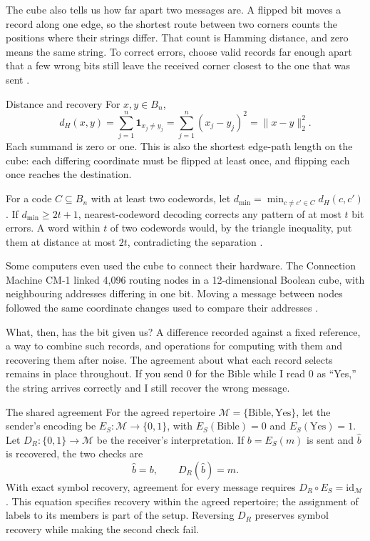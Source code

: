 \documentclass[11pt,a4paper]{article}
\theoremstyle{definition}
\begin{document}
The cube also tells us how far apart two messages are. A flipped
bit moves a record along one edge, so the shortest route between
two corners counts the positions where their strings differ.
That count is Hamming distance, and zero means the same string.
To correct errors, choose valid records far enough apart that a
few wrong bits still leave the received corner closest to the one
that was sent \citep{Hamming1950}.

\begin{formalnote}{Distance and recovery}
For $x,y\in B_n$,
\[
 d_H(x,y)=\sum_{j=1}^n\mathbf{1}_{x_j\ne y_j}
         =\sum_{j=1}^n(x_j-y_j)^2
         =\|x-y\|_2^2.
\]
Each summand is zero or one. This is also the shortest edge-path
length on the cube: each differing coordinate must be flipped at
least once, and flipping each once reaches the destination.

For a code $C\subseteq B_n$ with at least two codewords, let
$d_{\min}=\min_{c\ne c'\in C}d_H(c,c')$. If $d_{\min}\geq2t+1$,
nearest-codeword decoding corrects any pattern of at most $t$ bit
errors. A word within $t$ of two codewords would, by the triangle
inequality, put them at distance at most
$2t$, contradicting the separation \citep{Hamming1950}.
\end{formalnote}

Some computers even used the cube to connect their hardware.
The Connection Machine CM-1 linked 4,096 routing nodes in a
12-dimensional Boolean cube, with neighbouring addresses differing
in one bit. Moving a message between nodes followed the same
coordinate changes used to compare their addresses
\citep[Section~4.3]{Hillis1985}.

What, then, has the bit given us? A difference recorded against a
fixed reference, a way to combine such records, and operations for
computing with them and recovering them after noise. The agreement
about what each record selects remains in place throughout. If you
send $0$ for the Bible while I read $0$ as ``Yes,'' the string arrives
correctly and I still recover the wrong message.

\begin{formalnote}{The shared agreement}
For the agreed repertoire $\mathcal M=\{\text{Bible},\text{Yes}\}$,
let the sender's encoding be $E_S:\mathcal M\to\{0,1\}$, with
$E_S(\text{Bible})=0$ and $E_S(\text{Yes})=1$. Let
$D_R:\{0,1\}\to\mathcal M$ be the receiver's interpretation.
If $b=E_S(m)$ is sent and $\hat b$ is recovered, the two checks are
\[
 \hat b=b,\qquad D_R(\hat b)=m.
\]
With exact symbol recovery, agreement for every message requires
$D_R\circ E_S=\mathrm{id}_{\mathcal M}$. This equation specifies
recovery within the agreed repertoire; the assignment of labels
to its members is part of the setup. Reversing $D_R$ preserves
symbol recovery while making the second check fail.
\end{formalnote}
\end{document}

